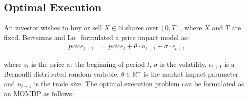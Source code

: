 \subsection{Optimal Execution}
\label{sec:results_oe}

An investor wishes to buy or sell {\footnotesize $ X \in \mathbb{N} $} shares over {\footnotesize $ [0, T] $}, where {\footnotesize $ X $} and {\footnotesize $ T $} are fixed. Bertsimas and Lo~\parencite{Bertsimas_JFM_1998} formulated a price impact model as:
\begin{align*}
    price_{t+1} &= price_t + \theta \cdot n_{t + 1} + \sigma \cdot \epsilon_{t+1}
\end{align*}

where {\footnotesize $ s_t $ } is the price at the beginning of period {\footnotesize $ t $}, {\footnotesize $\sigma$} is the volatility, {\footnotesize $\epsilon_{t+1}$} is a Bernoulli distributed random variable, {\footnotesize $\theta \in \mathbb{R}^{+}$ } is the market impact parameter and {\footnotesize $n_{t + 1}$} is the trade size. The optimal execution problem can be formulated as an MOMDP as follows:
